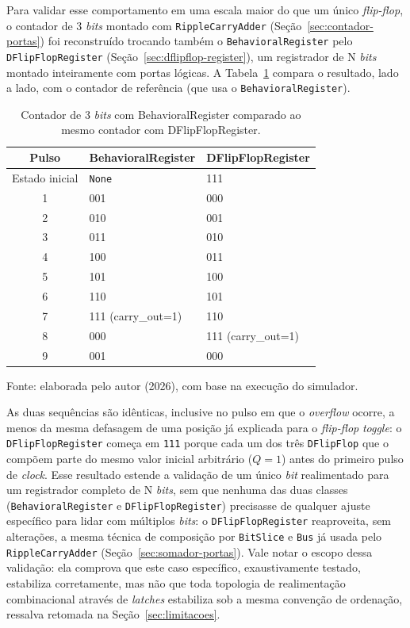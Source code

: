Para validar esse comportamento em uma escala maior do que um único \textit{flip-flop}, o contador de 3 \textit{bits} montado com \texttt{RippleCarryAdder} (Seção~\ref{sec:contador-portas}) foi reconstruído trocando também o \texttt{BehavioralRegister} pelo \texttt{DFlipFlopRegister} (Seção~\ref{sec:dflipflop-register}), um registrador de N \textit{bits} montado inteiramente com portas lógicas. A Tabela~\ref{tab:comparacao-registradores} compara o resultado, lado a lado, com o contador de referência (que usa o \texttt{BehavioralRegister}).

\begin{table}[H]
\centering
\caption{Contador de 3 \textit{bits} com BehavioralRegister comparado ao mesmo contador com DFlipFlopRegister.}
\label{tab:comparacao-registradores}
\begin{tabular}{c|l|l}
\hline
\textbf{Pulso} & \textbf{BehavioralRegister} & \textbf{DFlipFlopRegister} \\
\hline
Estado inicial & \texttt{None} & 111 \\
1 & 001 & 000 \\
2 & 010 & 001 \\
3 & 011 & 010 \\
4 & 100 & 011 \\
5 & 101 & 100 \\
6 & 110 & 101 \\
7 & 111 (carry\_out=1) & 110 \\
8 & 000 & 111 (carry\_out=1) \\
9 & 001 & 000 \\
\hline
\end{tabular}
\begin{center}
\footnotesize Fonte: elaborada pelo autor (2026), com base na execução do simulador.
\end{center}
\end{table}

As duas sequências são idênticas, inclusive no pulso em que o \textit{overflow} ocorre, a menos da mesma defasagem de uma posição já explicada para o \textit{flip-flop} \textit{toggle}: o \texttt{DFlipFlopRegister} começa em \texttt{111} porque cada um dos três \texttt{DFlipFlop} que o compõem parte do mesmo valor inicial arbitrário ($Q = 1$) antes do primeiro pulso de \textit{clock}. Esse resultado estende a validação de um único \textit{bit} realimentado para um registrador completo de N \textit{bits}, sem que nenhuma das duas classes (\texttt{BehavioralRegister} e \texttt{DFlipFlopRegister}) precisasse de qualquer ajuste específico para lidar com múltiplos \textit{bits}: o \texttt{DFlipFlopRegister} reaproveita, sem alterações, a mesma técnica de composição por \texttt{BitSlice} e \texttt{Bus} já usada pelo \texttt{RippleCarryAdder} (Seção~\ref{sec:somador-portas}). Vale notar o escopo dessa validação: ela comprova que este caso específico, exaustivamente testado, estabiliza corretamente, mas não que toda topologia de realimentação combinacional através de \textit{latches} estabiliza sob a mesma convenção de ordenação, ressalva retomada na Seção~\ref{sec:limitacoes}.

